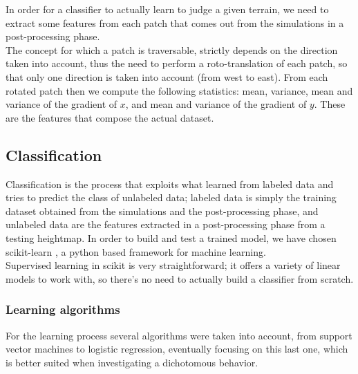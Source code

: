 \documentclass[]{usiinfbachelorproject}
\begin{document}
\noindent
In order for a classifier to actually learn to judge a given terrain, we need to extract some features from each patch that comes out from the simulations in a post-processing phase.\\
The concept for which a patch is traversable, strictly depends on the direction taken into account, thus the need to perform a roto-translation of each patch, so that only one direction
is taken into account (from west to east).
From each rotated patch then we compute the following statistics: mean, variance, mean and variance of the gradient of $x$, and mean and variance of the gradient of $y$. These are the features
that compose the actual dataset.

\subsection{Classification}
Classification is the process that exploits what learned from labeled data and tries to predict the class of unlabeled data; labeled data is simply the training dataset
obtained from the simulations and the post-processing phase, and unlabeled data are the features extracted in a post-processing phase from a testing heightmap.
In order to build and test a trained model, we have chosen scikit-learn \cite{scikit-learn}, a python based framework for machine learning.\\
Supervised learning in scikit is very straightforward; it offers a variety of linear models to work with, so there's no need to actually build a classifier from scratch.

\subsubsection{Learning algorithms}
For the learning process several algorithms were taken into account, from support vector machines to logistic regression, eventually focusing on this last one, which is better suited
when investigating a dichotomous behavior.
\end{document}
